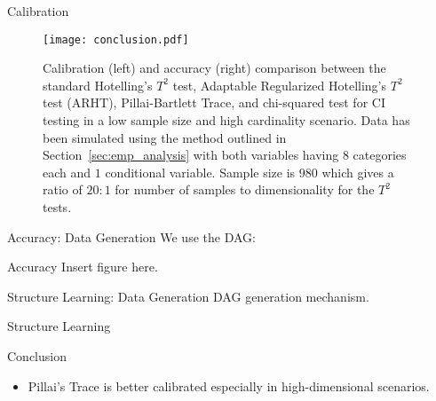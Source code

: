 \documentclass{beamer}
\begin{document}
\begin{frame}{Calibration}
	\begin{figure}[t]
		\centering
		\texttt{[image: conclusion.pdf]}
		\caption{Calibration (left) and accuracy (right) comparison between the
		standard Hotelling's $ T^2 $ test, Adaptable Regularized Hotelling's $
		T^2 $ test (ARHT), Pillai-Bartlett Trace, and chi-squared test for CI
		testing in a low sample size and high cardinality scenario. Data has
		been simulated using the method outlined in
		Section~\ref{sec:emp_analysis} with both variables having $ 8 $
		categories each and $ 1 $ conditional variable. Sample size is $ 980 $
		which gives a ratio of $ 20:1 $ for number of samples to dimensionality
		for the $T^2$ tests.}
		\label{fig:conc_compare}
	\end{figure}
\end{frame}

\begin{frame}{Accuracy: Data Generation}
	We use the DAG:

\begin{center}
\end{center}
\end{frame}

\begin{frame}{Accuracy}
	Insert figure here.
\end{frame}


\begin{frame}{Structure Learning: Data Generation}
	DAG generation mechanism.
\end{frame}

\begin{frame}{Structure Learning}
\end{frame}

\begin{frame}{Conclusion}
	\begin{itemize}
		\item Pillai's Trace is better calibrated especially in high-dimensional scenarios.
	\end{itemize}
\end{frame}
\end{document}
